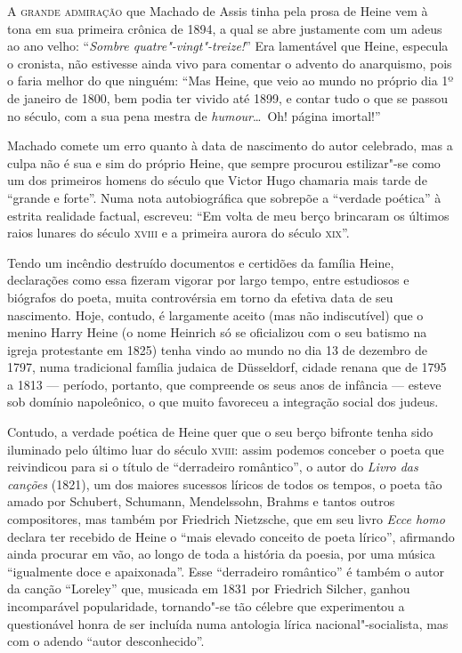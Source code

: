 

\textsc{A grande admiração} que Machado de Assis tinha pela prosa de Heine vem à
tona em sua primeira crônica de 1894, a qual se abre justamente com um
adeus ao ano velho: “\textit{Sombre quatre"-vingt"-treize!}” Era
lamentável que Heine, especula o cronista, não estivesse ainda vivo
para comentar o advento do anarquismo, pois o faria melhor do que
ninguém: “Mas Heine, que veio ao mundo no próprio dia 1º de janeiro de
1800, bem podia ter vivido até 1899, e contar tudo o que se passou no
século, com a sua pena mestra de \textit{humour}\ldots\ Oh! página
imortal!”

Machado comete um erro quanto à data de nascimento do autor celebrado,
mas a culpa não é sua e sim do próprio Heine, que sempre procurou
estilizar"-se como um dos primeiros homens do século que Victor Hugo
chamaria mais tarde  de “grande e forte”. Numa nota autobiográfica que
sobrepõe a “verdade poética” à estrita realidade factual, escreveu: “Em
volta de meu berço brincaram os últimos raios lunares do século \textsc{xviii} e
a primeira aurora do século \textsc{xix}”.

Tendo um incêndio destruído documentos e certidões da família Heine,
declarações como essa fizeram vigorar por largo tempo, entre estudiosos
e biógrafos do poeta, muita controvérsia em torno da efetiva data de
seu nascimento. Hoje, contudo, é largamente aceito (mas não
indiscutível) que o menino Harry Heine (o nome Heinrich só se
oficializou com o seu batismo na igreja protestante em 1825) tenha
vindo ao mundo no dia 13 de dezembro de 1797, numa tradicional família
judaica de Düsseldorf, cidade renana que de 1795 a 1813 --- período,
portanto, que compreende os seus anos de infância --- esteve sob domínio
napoleônico, o que muito favoreceu a integração social dos judeus.

Contudo, a verdade poética de Heine quer que o seu berço bifronte tenha
sido iluminado pelo último luar do século \textsc{xviii}: assim podemos conceber
o poeta que reivindicou para si o título de “derradeiro romântico”, o
autor do \textit{Livro das canções} (1821), um dos maiores sucessos
líricos de todos os tempos, o poeta tão amado por Schubert, Schumann,
Mendelssohn, Brahms e tantos outros compositores, mas também por
Friedrich Nietzsche, que em seu livro \textit{Ecce homo} declara ter
recebido de Heine o “mais elevado conceito de poeta lírico”, afirmando
ainda procurar em vão, ao longo de toda a história da poesia, por uma
música “igualmente doce e apaixonada”. Esse “derradeiro romântico” é
também o autor da canção “Loreley” que, musicada em 1831 por Friedrich
Silcher, ganhou incomparável popularidade, tornando"-se tão célebre
que experimentou a questionável honra de ser incluída numa antologia
lírica nacional"-socialista, mas com o adendo “autor desconhecido”.

